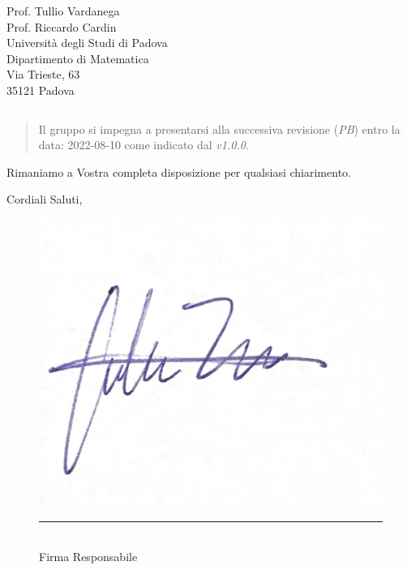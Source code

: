 \documentclass{articoletteracdp}
\begin{document}
\begin{letter}{
			Prof. Tullio Vardanega \\
			Prof. Riccardo Cardin \\
			Università degli Studi di Padova \\
			Dipartimento di Matematica \\
			Via Trieste, 63 \\
			35121 Padova
		}
\begin{quotation}
\begin{center}
\begin{tabular}{ c | c }
						\hline
					\end{tabular}
				\end{center}
			
		\end{quotation}

		\begin{quotation}
			\noindent
			Il gruppo si impegna a presentarsi alla successiva revisione (\textit{PB}) entro la data:
			2022-08-10 come indicato dal \PdP{} \textit{v1.0.0}.
		\end{quotation}

		\vspace{0.5cm}
		Rimaniamo a Vostra completa disposizione per qualsiasi chiarimento.

		\vspace{0.5cm}
		\closing{ Cordiali Saluti,}
		\begin{figure}[!h]
			\begin{flushright}
				\includegraphics[width=0.2\linewidth]{sezioni/firma.jpg}
			\end{flushright}
			\begin{flushright}
				\rule{100pt}{0.1pt}\\
				Firma Responsabile
			\end{flushright}
		\end{figure}
	\end{letter}
\end{document}
